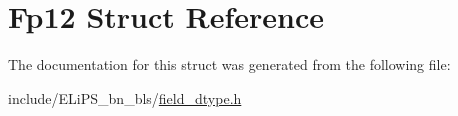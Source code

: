 \hypertarget{struct_fp12}{}\section{Fp12 Struct Reference}
\label{struct_fp12}


The documentation for this struct was generated from the following file\+:\begin{DoxyCompactItemize}
\item 
include/\+E\+Li\+P\+S\+\_\+bn\+\_\+bls/\hyperlink{field__dtype_8h}{field\+\_\+dtype.\+h}\end{DoxyCompactItemize}
